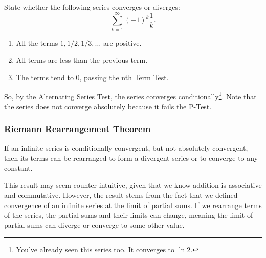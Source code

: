\begin{example}
	State whether the following series converges or diverges:
	\begin{equation*}
		\sum_{k=1}^{\infty}{(-1)^k\frac{1}{k}}.
	\end{equation*}
\end{example}
\begin{answer}
	\begin{enumerate}
		\item All the terms $1, 1/2, 1/3, \ldots$ are positive.
		\item All terms are less than the previous term.
		\item The terms tend to 0, passing the nth Term Test.
	\end{enumerate}
	
	So, by the Alternating Series Test, the series converges conditionally\footnote{You've already seen this series too. It converges to $\ln{2}$.}.
	Note that the series does not converge absolutely because it fails the P-Test.
\end{answer}

\subsubsection{Riemann Rearrangement Theorem}
\begin{theorem}
	If an infinite series is conditionally convergent, but not absolutely convergent, then its terms can be rearranged to form a divergent series or to converge to any constant.
\end{theorem}

This result may seem counter intuitive, given that we know addition is associative and commutative.
However, the result stems from the fact that we defined convergence of an infinite series at the limit of partial sums.
If we rearrange terms of the series, the partial sums and their limits can change, meaning the limit of partial sums can diverge or converge to some other value.